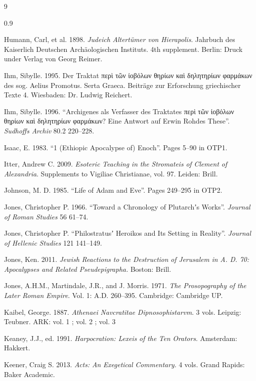\begin{thebibliography}{9}
\begin{spacing}{0.9}
\begin{small}
Humann, Carl, et al. 1898. %
\textit{Judeich Altertümer von Hierapolis}. %
Jahrbuch des Kaiserlich Deutschen Archäologischen Instituts. %
4th supplement. %
Berlin: Druck under Verlag von Georg Reimer. %

Ihm, Sibylle. 1995. %
Der Traktat περὶ τῶν ἰοβόλων θηρίων καὶ δηλητηρίων φαρμάκων des sog. Aelius Promotus. %
Serta Graeca. Beiträge zur Erforschung griechischer Texte 4. %
Wiesbaden: Dr. Ludwig Reichert. %

Ihm, Sibylle. 1996. %
“Archigenes als Verfasser des Traktates περὶ τῶν ἰοβόλων θηρίων καὶ δηλητηρίων φαρμάκων? %
Eine Antwort auf Erwin Rohdes These”. %
\textit{Sudhoffs Archiv} 80.2 220--228. %

Isaac, E. 1983. %
“1 (Ethiopic Apocalypse of) Enoch”. %
Pages 5--90 in OTP1. %

Itter, Andrew C. 2009. %
\textit{Esoteric Teaching in the Stromateis of Clement of Alexandria}. %
Supplements to Vigiliae Christianae, vol. 97. %
Leiden: Brill. %

Johnson, M. D. 1985. %
“Life of Adam and Eve”. %
Pages 249--295 in OTP2. %

Jones, Christopher P. 1966. %
“Toward a Chronology of Plutarchʼs Works”. %
\textit{Journal of Roman Studies} 56 61--74. %

Jones, Christopher P. “Philostratusʼ Heroikos and Its Setting in Reality”. %
\textit{Journal of Hellenic Studies} 121 141--149. %

Jones, Ken. 2011. %
\textit{Jewish Reactions to the Destruction of Jerusalem in A. D. 70: %
Apocalypses and Related Pseudepigrapha.} %
Boston: Brill. %

Jones, A.H.M., Martindale, J.R., and J. Morris. 1971. %
\textit{The Prosopography of the Later Roman Empire}. %
Vol. 1: A.D. 260--395. %
Cambridge: Cambridge UP. %

Kaibel, George. 1887. %
\textit{Athenaei Navcratitae Dipnosophistarvm}. %
3 vols. Leipzig: Teubner. %
ARK: vol. 1 ; vol. 2 ; vol. 3  %

Keaney, J.J., ed. 1991. %
\textit{Harpocration: Lexeis of the Ten Orators}. %
Amsterdam: Hakkert. %

Keener, Craig S. 2013. %
\textit{Acts: An Exegetical Commentary.} 4 vols. %
Grand Rapids: Baker Academic. %


\end{small}
\end{spacing}
\end{thebibliography}
